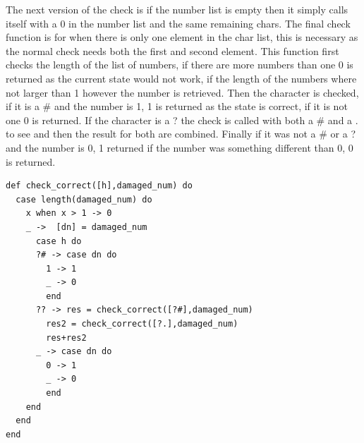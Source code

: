 \documentclass[a4paper,11pt]{article}
\begin{document}
The next version of the check is if the number list is empty then it simply calls itself with a 0 in the number list and the same remaining chars.
The final check function is for when there is only one element in the char list, this is necessary as the normal check needs both the first and second element. 
This function first checks the length of the list of numbers, if there are more numbers than one 0 is returned as the current state would not work, if the length of the numbers where not larger than 1 however the number is retrieved. Then the character is checked, if it is a \# and the number is 1, 1 is returned as the state is correct, if it is not one 0 is returned. If the character is a ? the check is called with both a \# and a . to see and then the result for both are combined. Finally if it was not a \# or a ? and the number is 0, 1 returned if the number was something different than 0, 0 is returned.
\begin{verbatim}
def check_correct([h],damaged_num) do
  case length(damaged_num) do
    x when x > 1 -> 0
    _ ->  [dn] = damaged_num
      case h do
      ?# -> case dn do
        1 -> 1
        _ -> 0
        end
      ?? -> res = check_correct([?#],damaged_num)
        res2 = check_correct([?.],damaged_num)
        res+res2
      _ -> case dn do
        0 -> 1
        _ -> 0
        end
    end
  end
end
\end{verbatim} 
\end{document}
